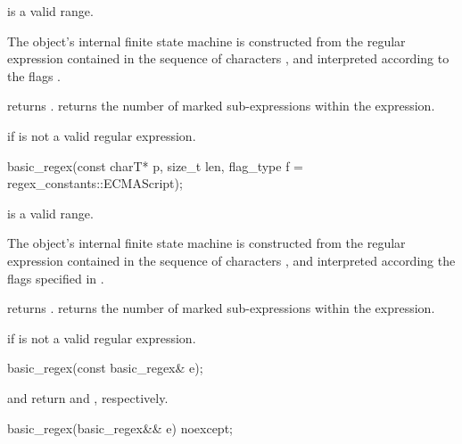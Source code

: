 \begin{itemdescr}
\pnum
\expects
{} is a valid range.

\pnum
\effects
The object's internal finite state machine
is constructed from the regular expression contained in
the sequence of characters
, and
interpreted according to the flags .

\pnum
\ensures
{} returns .
 returns the number of marked sub-expressions
within the expression.

\pnum
\throws
{} if
 is not a valid regular expression.
\end{itemdescr}

%
\begin{itemdecl}
basic_regex(const charT* p, size_t len, flag_type f = regex_constants::ECMAScript);
\end{itemdecl}

\begin{itemdescr}
\pnum
\expects
{} is a valid range.

\pnum
\effects
The object's internal finite state machine
is constructed from the regular expression contained in
the sequence of characters , and
interpreted according the flags specified in .

\pnum
\ensures
{} returns .
 returns the number of marked sub-expressions
within the expression.

\pnum
\throws
{} if  is not a valid regular expression.
\end{itemdescr}

%
\begin{itemdecl}
basic_regex(const basic_regex& e);
\end{itemdecl}

\begin{itemdescr}
\pnum
\ensures
{} and  return
 and , respectively.
\end{itemdescr}

%
\begin{itemdecl}
basic_regex(basic_regex&& e) noexcept;
\end{itemdecl}

